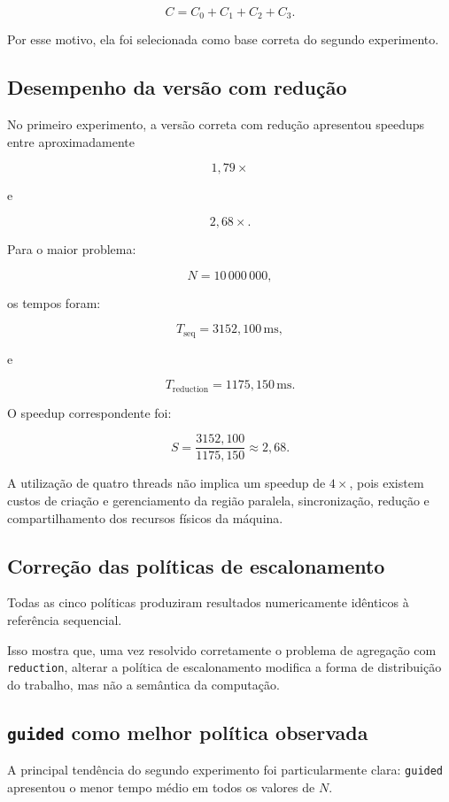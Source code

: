\[
C=
C_0+C_1+C_2+C_3.
\]

Por esse motivo, ela foi selecionada como base correta do segundo
experimento.


\subsection{Desempenho da versão com redução}

No primeiro experimento, a versão correta com redução apresentou speedups
entre aproximadamente

\[
1,79\times
\]

e

\[
2,68\times.
\]

Para o maior problema:

\[
N=10\,000\,000,
\]

os tempos foram:

\[
T_{\mathrm{seq}}
=
3152,100\,\mathrm{ms},
\]

e

\[
T_{\mathrm{reduction}}
=
1175,150\,\mathrm{ms}.
\]

O speedup correspondente foi:

\[
S
=
\frac{3152,100}{1175,150}
\approx
2,68.
\]

A utilização de quatro threads não implica um speedup de \(4\times\),
pois existem custos de criação e gerenciamento da região paralela,
sincronização, redução e compartilhamento dos recursos físicos da máquina.


\subsection{Correção das políticas de escalonamento}

Todas as cinco políticas produziram resultados numericamente idênticos à
referência sequencial.

Isso mostra que, uma vez resolvido corretamente o problema de agregação com
\texttt{reduction}, alterar a política de escalonamento modifica a forma de
distribuição do trabalho, mas não a semântica da computação.


\subsection{\texttt{guided} como melhor política observada}

A principal tendência do segundo experimento foi particularmente clara:
\texttt{guided} apresentou o menor tempo médio em todos os valores de \(N\).

